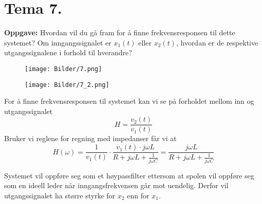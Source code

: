 \documentclass[a4paper,11pt,norsk]{article}
\begin{document}
\section{Tema 7.}
\begin{question}
    \textbf{Oppgave:}
        Hvordan vil du gå fram for å finne frekvensresponsen til dette systemet?
        Om inngangssignalet er $x_1(t)$ eller $x_2(t)$, hvordan er de respektive
        utgangssignalene i forhold til hverandre?
                
        \begin{figure}[H]
            \centering 
            \begin{minipage}{0.3\textwidth}
                \texttt{[image: Bilder/7.png]}
            \end{minipage}
            \begin{minipage}{0.3\textwidth}
                \texttt{[image: Bilder/7\_2.png]}
            \end{minipage}
        \end{figure}
\end{question}
For å finne frekvensresponsen til systemet kan vi se på forholdet mellom inn 
og utgangssignalet
\[
    H = \frac{v_2(t)}{v_1(t)}
\]
Bruker vi reglene for regning med impedanser får vi at
\[
H(\omega) = \frac{1}{v_1(t)} \cdot \frac{v_1(t) \cdot j\omega L}{R + j\omega L + \frac{1}{j\omega C}} = \frac{j\omega L}{R + j\omega L + \frac{1}{j\omega C}}
\]

Systemet vil oppføre seg som et høypassfilter ettersom at spolen vil oppføre seg som en ideell leder når inngangsfrekvensen 
går mot uendelig. Derfor vil utgangssignalet ha større styrke for $x_2$ enn for $x_1$.

\newpage
\end{document}

